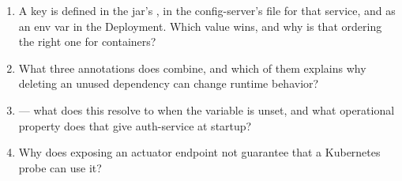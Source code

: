 \begin{quiz}
\begin{enumerate}
  \item A key is defined in the jar's , in the
  config-server's file for that service, and as an env var in the
  Deployment. Which value wins, and why is that ordering the right one
  for containers?
  \item What three annotations does 
  combine, and which of them explains why deleting an unused dependency
  can change runtime behavior?
  \item {} --- what does this
  resolve to when the variable is unset, and what operational property
  does that give auth-service at startup?
  \item Why does exposing an actuator endpoint not guarantee that a
  Kubernetes probe can use it?
\end{enumerate}
\end{quiz}
